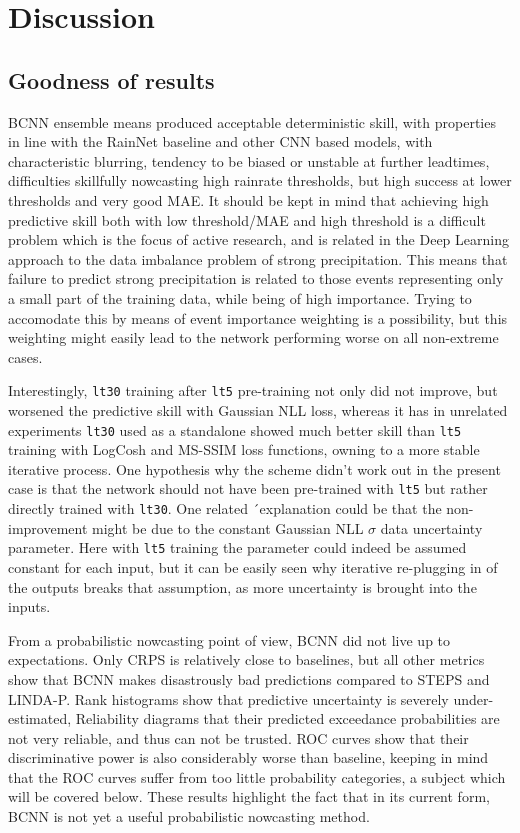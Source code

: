 \chapter{Discussion}
\label{chapter:discussion}

\section{Goodness of results}


BCNN ensemble means produced acceptable deterministic skill, with properties in line with the RainNet baseline \cite{ayzel_rainnet_nodate} and other CNN based models, with characteristic blurring, tendency to be biased or unstable at further leadtimes, difficulties skillfully nowcasting high rainrate thresholds, but high success at lower thresholds and very good MAE. It should be kept in mind that achieving high predictive skill both with low threshold/MAE and high threshold is a difficult problem which is the focus of active research, and is related in the Deep Learning approach to the data imbalance problem of strong precipitation. This means that failure to predict strong precipitation is related to those events representing only a small part of the training data, while being of high importance. Trying to accomodate this by means of event importance weighting is a possibility, but this weighting might easily lead to the network performing worse on all non-extreme cases.


Interestingly, \texttt{lt30} training after \texttt{lt5} pre-training not only did not improve, but worsened the predictive skill with Gaussian NLL loss, whereas it has in unrelated experiments \texttt{lt30} used as a standalone showed much better skill than \texttt{lt5} training with LogCosh and MS-SSIM loss functions, owning to a more stable iterative process. One hypothesis why the scheme didn't work out in the present case is that the network should not have been pre-trained with \texttt{lt5} but rather directly trained with \texttt{lt30}. One related ´explanation could be that the non-improvement might be due to the constant Gaussian NLL $\sigma$ data uncertainty parameter. Here with \texttt{lt5} training the parameter could indeed be assumed constant for each input, but it can be easily seen why iterative re-plugging in of the outputs breaks that assumption, as more uncertainty is brought into the inputs.

From a probabilistic nowcasting point of view, BCNN did not live up to expectations. Only CRPS is relatively close to baselines, but all other metrics show that BCNN makes disastrously bad predictions compared to STEPS and LINDA-P. Rank histograms show that predictive uncertainty is severely under-estimated, Reliability diagrams that their predicted exceedance probabilities are not very reliable, and thus can not be trusted. ROC curves show that their discriminative power is also considerably worse than baseline, keeping in mind that the ROC curves suffer from too little probability categories, a subject which will be covered below. These results highlight the fact that in its current form, BCNN is not yet a useful probabilistic nowcasting method.

